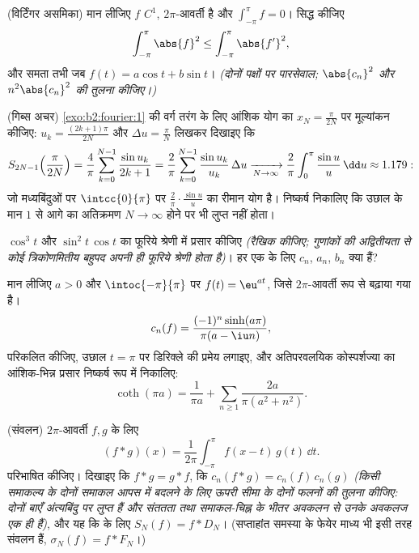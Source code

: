 \begin{exercise}[$\star\star\star$]\label{exo:b2:fourier:7}
(विर्टिंगर असमिका) मान लीजिए $f$ $C^1$, $2\pi$-आवर्ती है और $\int_{-\pi}^{\pi} f = 0$। सिद्ध कीजिए
\[
\int_{-\pi}^{\pi} \abs{f}^2 \leq \int_{-\pi}^{\pi} \abs{f'}^2 ,
\]
और समता तभी जब $f(t) = a\cos t + b\sin t$। \emph{(दोनों पक्षों पर पारसेवाल; $\abs{c_n}^2$ और $n^2\abs{c_n}^2$ की तुलना
कीजिए।)}
\end{exercise}

\begin{exercise}[$\star\star\star$]\label{exo:b2:fourier:8}
(गिब्स अचर) \cref{exo:b2:fourier:1} की वर्ग तरंग के लिए आंशिक योग का $x_N =
\frac{\pi}{2N}$ पर मूल्यांकन कीजिए:
$u_k = \frac{(2k+1)\pi}{2N}$ और $\Delta u
= \frac{\pi}{N}$ लिखकर दिखाइए कि
\[
S_{2N-1}\Bigl(\frac{\pi}{2N}\Bigr)
= \frac{4}{\pi}\sum_{k=0}^{N-1} \frac{\sin u_k}{2k+1}
= \frac{2}{\pi}\sum_{k=0}^{N-1} \frac{\sin u_k}{u_k}\,\Delta u
\xrightarrow[N\to\infty]{}
\frac{2}{\pi}\int_0^{\pi}\frac{\sin u}{u}\,\dd u \approx 1.179 :
\]
जो मध्यबिंदुओं पर $\intcc{0}{\pi}$ पर $\frac{2}{\pi}\cdot\frac{\sin u}{u}$ का रीमान योग है। निष्कर्ष निकालिए कि उछाल के
मान $1$ से आगे का अतिक्रमण $N \to \infty$ होने पर भी लुप्त नहीं होता।
\end{exercise}

\begin{exercise}[$\star$]\label{exo:b2:fourier:9}
$\cos^3 t$ और $\sin^2 t\,\cos t$ का फूरिये श्रेणी में प्रसार कीजिए \emph{(रैखिक कीजिए; गुणांकों
की अद्वितीयता से कोई त्रिकोणमितीय बहुपद अपनी ही फूरिये श्रेणी होता है)}।
हर एक के लिए $c_n$, $a_n$, $b_n$ क्या हैं?
\end{exercise}

\begin{exercise}[$\star\star$]\label{exo:b2:fourier:10}
मान लीजिए $a > 0$ और $\intoc{-\pi}{\pi}$ पर $f(t) = \eu^{at}$, जिसे $2\pi$-आवर्ती रूप से बढ़ाया गया है। \[
c_n(f) = \frac{(-1)^n\sinh(a\pi)}{\pi(a - \iu n)} ,
\]
परिकलित कीजिए, उछाल $t = \pi$ पर डिरिक्ले की प्रमेय लगाइए, और अतिपरवलयिक
कोस्पर्शज्या का आंशिक-भिन्न प्रसार निष्कर्ष रूप में निकालिए:
\[
\coth(\pi a) = \frac{1}{\pi a} + \sum_{n\geq1}
\frac{2a}{\pi(a^2 + n^2)} .
\]
\end{exercise}

\begin{exercise}[$\star\star$]\label{exo:b2:fourier:11}
(संवलन)  $2\pi$-आवर्ती $f, g$ के लिए
\[
(f * g)(x) = \frac{1}{2\pi}\int_{-\pi}^{\pi} f(x - t)\,g(t)\,
\dd t .
\]
परिभाषित कीजिए। दिखाइए कि $f * g = g * f$, कि $c_n(f*g) = c_n(f)\,c_n(g)$ \emph{(किसी  समाकल्य के दोनों
समाकल आपस में बदलने के लिए ऊपरी सीमा के दोनों फलनों की तुलना कीजिए: दोनों
बाएँ अंत्यबिंदु पर लुप्त हैं और संततता तथा समाकल-चिह्न के भीतर अवकलन से
उनके अवकलज एक ही हैं)}, और यह कि  के लिए $S_N(f) =
f * D_N$। (सप्ताहांत
समस्या के फेयेर माध्य भी इसी तरह संवलन हैं, $\sigma_N(f) = f *
F_N$।)
\end{exercise}

